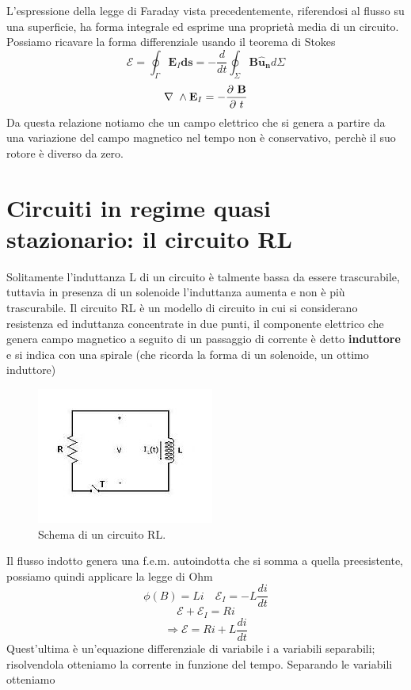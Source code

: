 \documentclass[
10pt, %
a4paper, %
oneside, %
headinclude,footinclude, %
BCOR5mm, %
]{scrartcl}
\begin{document}
L'espressione della legge di Faraday vista precedentemente, riferendosi al flusso su una superficie, ha forma integrale ed esprime una proprietà media di un circuito. Possiamo ricavare la forma differenziale usando il teorema di Stokes
\[\mathcal{E} = \oint_{\Gamma}\mathbf{E}_I \mathbf{ds} = -\frac{d}{dt}\oint_{\Sigma}\mathbf{B\mathbf{\hat{u}_n}}d\Sigma\]
\begin{align}\label{eq:Faraday_differenziale}
	\nabla\ \wedge\mathbf{E}_I = -\frac{\partial\  \mathbf{B}}{\partial\  t}
\end{align}
Da questa relazione notiamo che un campo elettrico che si genera a partire da una variazione del campo magnetico nel tempo non è conservativo, perchè il suo rotore è diverso da zero.
\newpage
\section{Circuiti in regime quasi stazionario: il circuito RL}
Solitamente l'induttanza L di un circuito è talmente bassa da essere trascurabile, tuttavia in presenza di un solenoide l'induttanza aumenta e non è più trascurabile. Il circuito RL è un modello di circuito in cui si considerano resistenza ed induttanza concentrate in due punti, il componente elettrico che genera campo magnetico a seguito di un passaggio di corrente è detto \textbf{induttore} e si indica con una spirale (che ricorda la forma di un solenoide, un ottimo induttore)
\begin{figure}[h!]
	\centering
	\includegraphics[width=0.6\linewidth]{../images/circuito_RL}
	\caption{Schema di un circuito RL.}
	\label{fig:circuitorl}
\end{figure}
\FloatBarrier
Il flusso indotto genera una f.e.m. autoindotta che si somma a quella preesistente, possiamo quindi applicare la legge di Ohm 
\[\phi(B) = L i \quad \mathcal{E}_I = -L\frac{d i}{dt}\]
\[\mathcal{E} + \mathcal{E}_I = Ri \]
\[\Rightarrow \mathcal{E} = Ri+L\frac{di}{dt}\]
Quest'ultima è un'equazione differenziale di variabile i a variabili separabili; risolvendola otteniamo la corrente in funzione del tempo. Separando le variabili otteniamo
\end{document}
